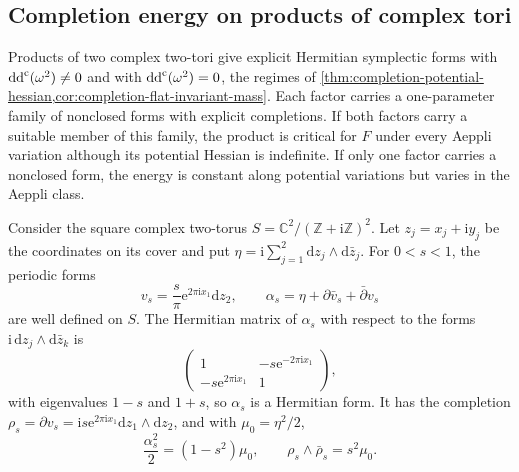 \subsection{Completion energy on products of complex tori}
\label{subsec:torus-completion-critical}

Products of two complex two-tori give explicit Hermitian symplectic forms with $\mathrm{dd}^{\mathrm{c}}(\omega^2)\ne0$ and with $\mathrm{dd}^{\mathrm{c}}(\omega^2)=0$, the regimes of \cref{thm:completion-potential-hessian,cor:completion-flat-invariant-mass}. Each factor carries a one-parameter family of nonclosed forms with explicit completions. If both factors carry a suitable member of this family, the product is critical for $F$ under every Aeppli variation although its potential Hessian is indefinite. If only one factor carries a nonclosed form, the energy is constant along potential variations but varies in the Aeppli class.

Consider the square complex two-torus $S=\mathbb C^2/(\mathbb Z+\mathrm i\mathbb Z)^2$. Let $z_j=x_j+\mathrm i y_j$ be the coordinates on its cover and put $\eta=\mathrm i\sum_{j=1}^2\mathrm dz_j\wedge\mathrm d\bar z_j$. For $0<s<1$, the periodic forms
\[
 v_s=\frac{s}{\pi}\mathrm e^{2\pi\mathrm i x_1}\mathrm dz_2,
 \qquad \alpha_s=\eta+\partial\bar v_s+\bar\partial v_s
\]
are well defined on $S$. The Hermitian matrix of $\alpha_s$ with respect to the forms $\mathrm i\,\mathrm dz_j\wedge\mathrm d\bar z_k$ is
\[
 \begin{pmatrix}1&-s\mathrm e^{-2\pi\mathrm i x_1}\\
 -s\mathrm e^{2\pi\mathrm i x_1}&1\end{pmatrix},
\]
with eigenvalues $1-s$ and $1+s$, so $\alpha_s$ is a Hermitian form. It has the completion $\rho_s=\partial v_s=\mathrm i s\mathrm e^{2\pi\mathrm i x_1}\mathrm dz_1\wedge\mathrm dz_2$, and with $\mu_0=\eta^2/2$,
\[
 \frac{\alpha_s^2}{2}=(1-s^2)\mu_0,
 \qquad \rho_s\wedge\bar\rho_s=s^2\mu_0.
\]

